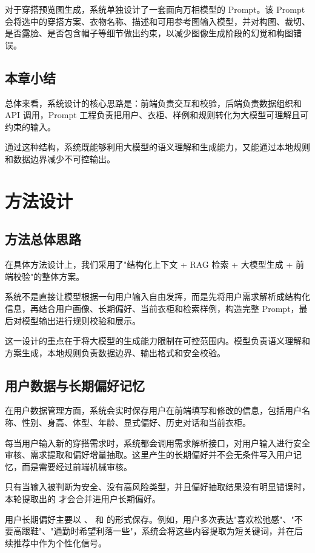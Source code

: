\documentclass{applemlr}
\begin{document}
对于穿搭预览图生成，系统单独设计了一套面向万相模型的 Prompt。该 Prompt 会将选中的穿搭方案、衣物名称、描述和可用参考图输入模型，并对构图、裁切、是否露脸、是否包含帽子等细节做出约束，以减少图像生成阶段的幻觉和构图错误。

\subsection{本章小结}

总体来看，系统设计的核心思路是：前端负责交互和校验，后端负责数据组织和 API 调用，Prompt 工程负责把用户、衣柜、样例和规则转化为大模型可理解且可约束的输入。

通过这种结构，系统既能够利用大模型的语义理解和生成能力，又能通过本地规则和数据边界减少不可控输出。

\section{方法设计}
\label{sec:method}

\subsection{方法总体思路}

在具体方法设计上，我们采用了"结构化上下文 + RAG 检索 + 大模型生成 + 前端校验"的整体方案。

系统不是直接让模型根据一句用户输入自由发挥，而是先将用户需求解析成结构化信息，再结合用户画像、长期偏好、当前衣柜和检索样例，构造完整 Prompt，最后对模型输出进行规则校验和展示。

这一设计的重点在于将大模型的生成能力限制在可控范围内。模型负责语义理解和方案生成，本地规则负责数据边界、输出格式和安全校验。

\subsection{用户数据与长期偏好记忆}

在用户数据管理方面，系统会实时保存用户在前端填写和修改的信息，包括用户名称、性别、身高、体型、年龄、显式偏好、历史对话和当前衣柜。

每当用户输入新的穿搭需求时，系统都会调用需求解析接口，对用户输入进行安全审核、需求提取和偏好增量抽取。这里产生的长期偏好并不会无条件写入用户记忆，而是需要经过前端机械审核。

只有当输入被判断为安全、没有高风险类型，并且偏好抽取结果没有明显错误时，本轮提取出的  才会合并进用户长期偏好。

用户长期偏好主要以 、 和  的形式保存。例如，用户多次表达"喜欢松弛感"、"不要高跟鞋"、"通勤时希望利落一些"，系统会将这些内容提取为短关键词，并在后续推荐中作为个性化信号。
\end{document}
